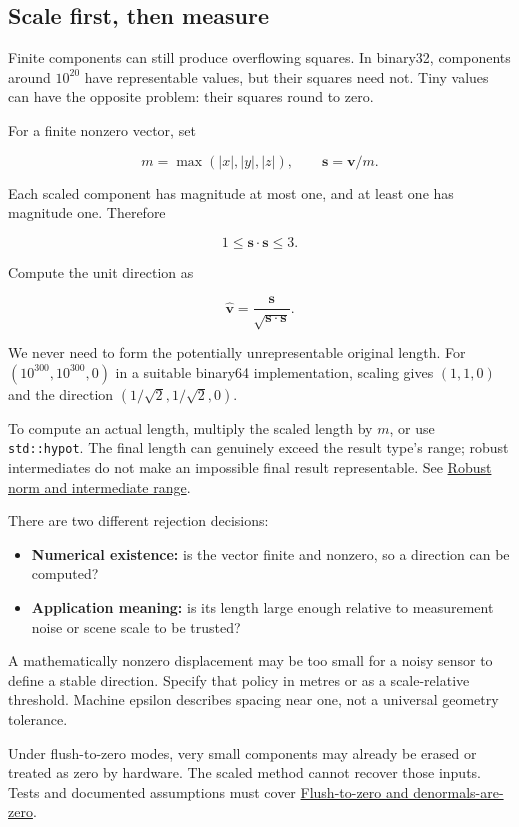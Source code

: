 \subsection{Scale first, then measure}\label{01-foundations-i-ch017-scale-first-then-measure}

Finite components can still produce overflowing squares. In binary32, components around \(10^{20}\) have representable values, but their squares need not. Tiny values can have the opposite problem: their squares round to zero.

For a finite nonzero vector, set

\[
m=\max(|x|,|y|,|z|),\qquad
\mathbf s=\mathbf v/m.
\]

Each scaled component has magnitude at most one, and at least one has magnitude one. Therefore

\[
1\le\mathbf s\cdot\mathbf s\le3.
\]

Compute the unit direction as

\[
\widehat{\mathbf v}=\frac{\mathbf s}{\sqrt{\mathbf s\cdot\mathbf s}}.
\]

We never need to form the potentially unrepresentable original length. For \((10^{300},10^{300},0)\) in a suitable binary64 implementation, scaling gives \((1,1,0)\) and the direction \((1/\sqrt2,1/\sqrt2,0)\).

To compute an actual length, multiply the scaled length by \(m\), or use \texttt{std::hypot}. The final length can genuinely exceed the result type's range; robust intermediates do not make an impossible final result representable. See \hyperref[appendix-7f1e17dcafb1]{Robust norm and intermediate range}.

There are two different rejection decisions:

\begin{itemize}
\tightlist
\item
  \textbf{Numerical existence:} is the vector finite and nonzero, so a direction can be computed?
\item
  \textbf{Application meaning:} is its length large enough relative to measurement noise or scene scale to be trusted?
\end{itemize}

A mathematically nonzero displacement may be too small for a noisy sensor to define a stable direction. Specify that policy in metres or as a scale-relative threshold. Machine epsilon describes spacing near one, not a universal geometry tolerance.

Under flush-to-zero modes, very small components may already be erased or treated as zero by hardware. The scaled method cannot recover those inputs. Tests and documented assumptions must cover \hyperref[appendix-e979eb012782]{Flush-to-zero and denormals-are-zero}.

